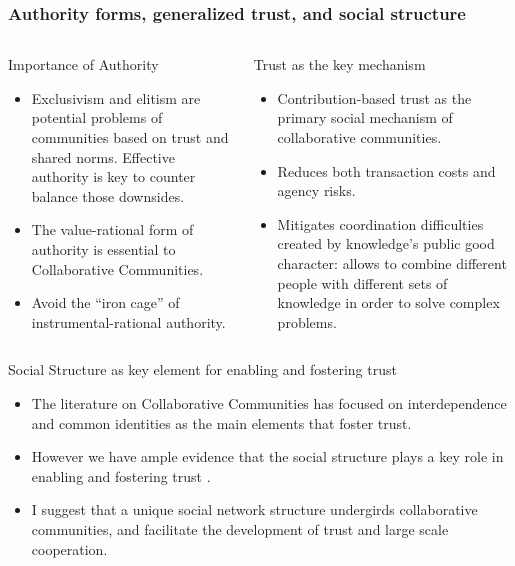 \documentclass[ignorenonframetext,red,8pt,notes=hide]{beamer}
\begin{document}
\begin{frame}
\end{frame}

\begin{frame}
\frametitle{Authority forms, generalized trust, and social structure}

\begin{columns}[c]

\begin{column}{0.5\textwidth}
\begin{block}{Importance of Authority}
\begin{itemize}
\item Exclusivism and elitism are potential problems of communities based on trust and shared norms. Effective authority is key to counter balance those downsides.
\item The value-rational form of authority is essential to Collaborative Communities.
\item Avoid the ``iron cage'' of instrumental-rational authority.
\end{itemize}
\end{block}
\end{column}

\pause

\begin{column}{0.5\textwidth}
\begin{block}{Trust as the key mechanism}
\begin{itemize}
\item Contribution-based trust as the primary social mechanism of collaborative communities.
\item Reduces both transaction costs and agency risks.
\item Mitigates coordination difficulties created by knowledge's public good character: allows to combine different people with different sets of knowledge in order to solve complex problems.
\end{itemize}
\end{block}
\end{column}

\end{columns}

\pause

\begin{block}{Social Structure as key element for enabling and fostering trust}
\begin{itemize}
\item The literature on Collaborative Communities has focused on interdependence and common identities as the main elements that foster trust.
\item However we have ample evidence that the social structure plays a key role in enabling and fostering trust \citep{granovetter:1985,coleman:1988,moody:2003}. 
\item I suggest that a unique social network structure undergirds collaborative communities, and facilitate the development of trust and large scale cooperation.
\end{itemize}
\end{block}

\end{frame}
\end{document}
